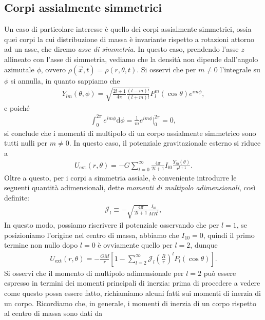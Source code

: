 \subsection{Corpi assialmente simmetrici}
Un caso di particolare interesse è quello dei corpi assialmente simmetrici, ossia quei corpi la cui distribuzione di massa è invariante rispetto a rotazioni attorno ad un asse, che diremo \emph{asse di simmetria}. In questo caso, prendendo l'asse $z$ allineato con l'asse di simmetria, vediamo che la densità non dipende dall'angolo azimutale $\phi$, ovvero $\rho(\vec{x}, t)=\rho(r, \theta, t)$. Si osservi che per $m \neq 0$ l'integrale su $\phi$ si annulla, in quanto sappiamo che
\begin{align}
	Y_{lm}(\theta, \phi) = \sqrt{\frac{2l+1}{4\pi} \frac{(l-m)!}{(l+m)!}} P_l^m(\cos{\theta}) e^{im\phi},
\end{align}
e poiché
\begin{align}
	\int_0^{2 \pi} e^{im \phi} \mathrm{d}\phi = \frac{1}{m} e^{im \phi} \Big|_0^{2 \pi} = 0,
\end{align}
si conclude che i momenti di multipolo di un corpo assialmente simmetrico sono tutti nulli per $m \neq 0$. In questo caso, il potenziale gravitazionale esterno si riduce a
\begin{align}
	U_{\text{ext}}(r, \theta) = -G \sum_{l=0}^\infty \frac{4 \pi}{2l + 1} I_{l0} \frac{Y_{l0}(\theta)}{r^{l+1}}.
\end{align}
Oltre a questo, per i corpi a simmetria assiale, è conveniente introdurre le seguenti quantità adimensionali, dette \emph{momenti di multipolo adimensionali}, così definite:
\begin{align}
	\mathcal{J}_l \equiv -\sqrt{\frac{4 \pi}{2l+1}} \frac{I_{l0}}{M R^l},
\end{align}
In questo modo, possiamo riscrivere il potenziale osservando che per $l=1$, se posizioniamo l'origine nel centro di massa, abbiamo che $I_{10} = 0$, quindi il primo termine non nullo dopo $l=0$ è ovviamente quello per $l=2$, dunque
\begin{align}
	U_{\text{ext}}(r, \theta) = -\frac{GM}{r} \left[ 1 - \sum_{l=2}^\infty \mathcal{J}_l \left( \frac{R}{r} \right)^l P_l(\cos{\theta}) \right].
\end{align}
Si osservi che il momento di multipolo adimensionale per $l=2$ può essere espresso in termini dei momenti principali di inerzia: prima di procedere a vedere come questo possa essere fatto, richiamiamo alcuni fatti sui momenti di inerzia di un corpo. Ricordiamo che, in generale, i momenti di inerzia di un corpo rispetto al centro di massa sono dati da
